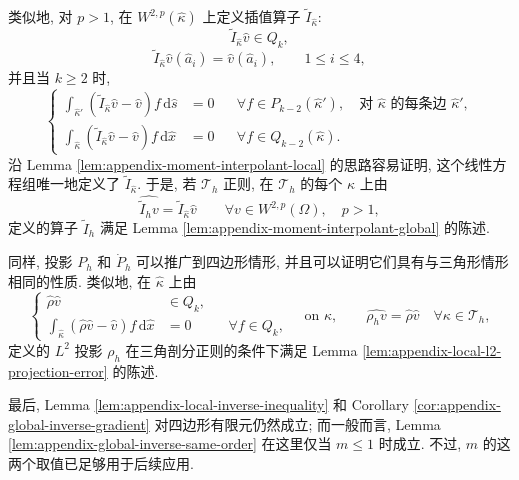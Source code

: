 类似地, 对 $p>1$, 在 $W^{2,p}(\hat\kappa)$ 上定义插值算子
$\widetilde I_{\hat\kappa}$:
\[
\widetilde I_{\hat\kappa}\hat v\in Q_k,
\]
\[
\widetilde I_{\hat\kappa}\hat v(\hat a_i)=\hat v(\hat a_i),
\qquad
1\leq i\leq4,
\]
并且当 $k\geq2$ 时,
\[
\left\{
\begin{aligned}
\int_{\hat\kappa'}
(\widetilde I_{\hat\kappa}\hat v-\hat v)f\,\mathrm{d}\hat s
&=0
&&\forall f\in P_{k-2}(\hat\kappa'),
\quad\text{对 $\hat\kappa$ 的每条边 $\hat\kappa'$},\\
\int_{\hat\kappa}
(\widetilde I_{\hat\kappa}\hat v-\hat v)f\,\mathrm{d}\hat x
&=0
&&\forall f\in Q_{k-2}(\hat\kappa).
\end{aligned}
\right.
\]
沿 Lemma \ref{lem:appendix-moment-interpolant-local} 的思路容易证明,
这个线性方程组唯一地定义了 $\widetilde I_{\hat\kappa}$.
于是, 若 $\mathcal{T}_h$ 正则, 在 $\mathcal{T}_h$ 的每个
$\kappa$ 上由
\[
\widehat{\widetilde I_hv}
=
\widetilde I_{\hat\kappa}\hat v
\qquad
\forall v\in W^{2,p}(\Omega),
\quad p>1,
\]
定义的算子 $\widetilde I_h$ 满足 Lemma
\ref{lem:appendix-moment-interpolant-global} 的陈述.

同样, 投影 $P_h$ 和 $\dot P_h$ 可以推广到四边形情形,
并且可以证明它们具有与三角形情形相同的性质.
类似地, 在 $\hat\kappa$ 上由
\begin{equation}\label{eq:appendix-quadrilateral-l2-projection}
\left\{
\begin{aligned}
\hat\rho\hat v&\in Q_k,\\
\int_{\hat\kappa}(\hat\rho\hat v-\hat v)f\,\mathrm{d}\hat x&=0
&&\forall f\in Q_k,
\end{aligned}
\right.
\quad\text{on }\hat\kappa,
\qquad
\widehat{\rho_hv}=\hat\rho\hat v
\quad
\forall\kappa\in\mathcal{T}_h,
\end{equation}
定义的 $L^2$ 投影 $\rho_h$ 在三角剖分正则的条件下满足
Lemma \ref{lem:appendix-local-l2-projection-error} 的陈述.

最后, Lemma \ref{lem:appendix-local-inverse-inequality} 和 Corollary
\ref{cor:appendix-global-inverse-gradient} 对四边形有限元仍然成立;
而一般而言, Lemma \ref{lem:appendix-global-inverse-same-order}
在这里仅当 $m\leq1$ 时成立. 不过, $m$ 的这两个取值已足够用于后续应用.
